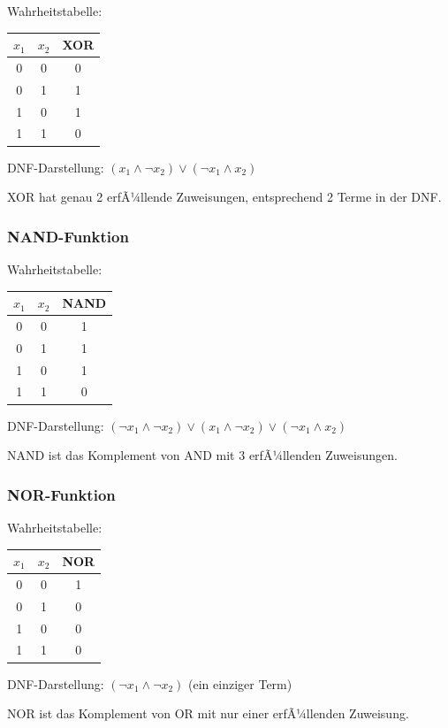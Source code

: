 ﻿\documentclass[a4paper,12pt]{article}
\theoremstyle{definition}
\begin{document}
Wahrheitstabelle:
\begin{center}
\begin{tabular}{cc|c}
$x_1$ & $x_2$ & XOR \\
\hline
0 & 0 & 0 \\
0 & 1 & 1 \\
1 & 0 & 1 \\
1 & 1 & 0
\end{tabular}
\end{center}

DNF-Darstellung: $(x_1 \land \neg x_2) \lor (\neg x_1 \land x_2)$

XOR hat genau 2 erfÃ¼llende Zuweisungen, entsprechend 2 Terme in der DNF.

\subsubsection{NAND-Funktion}

Wahrheitstabelle:
\begin{center}
\begin{tabular}{cc|c}
$x_1$ & $x_2$ & NAND \\
\hline
0 & 0 & 1 \\
0 & 1 & 1 \\
1 & 0 & 1 \\
1 & 1 & 0
\end{tabular}
\end{center}

DNF-Darstellung: $(\neg x_1 \land \neg x_2) \lor (x_1 \land \neg x_2) \lor (\neg x_1 \land x_2)$

NAND ist das Komplement von AND mit 3 erfÃ¼llenden Zuweisungen.

\subsubsection{NOR-Funktion}

Wahrheitstabelle:
\begin{center}
\begin{tabular}{cc|c}
$x_1$ & $x_2$ & NOR \\
\hline
0 & 0 & 1 \\
0 & 1 & 0 \\
1 & 0 & 0 \\
1 & 1 & 0
\end{tabular}
\end{center}

DNF-Darstellung: $(\neg x_1 \land \neg x_2)$ (ein einziger Term)

NOR ist das Komplement von OR mit nur einer erfÃ¼llenden Zuweisung.
\end{document}
